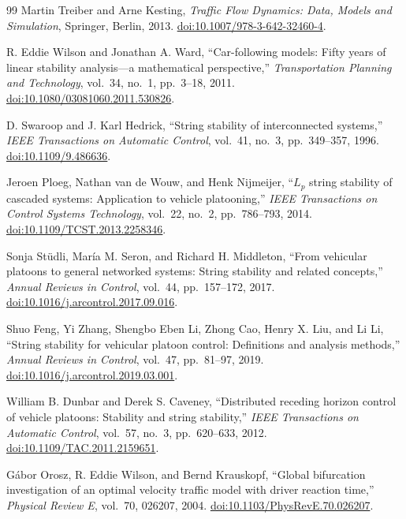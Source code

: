 \documentclass[11pt,a4paper,openany]{book}
\numberwithin{equation}{chapter}
\numberwithin{figure}{chapter}
\numberwithin{table}{chapter}
\begin{document}
\begin{thebibliography}{99}
Martin Treiber and Arne Kesting,
\emph{Traffic Flow Dynamics: Data, Models and Simulation},
Springer, Berlin, 2013.
\href{https://doi.org/10.1007/978-3-642-32460-4}{doi:10.1007/978-3-642-32460-4}.

R. Eddie Wilson and Jonathan A. Ward,
``Car-following models: Fifty years of linear stability analysis---a mathematical perspective,''
\emph{Transportation Planning and Technology}, vol.~34, no.~1, pp.~3--18, 2011.
\href{https://doi.org/10.1080/03081060.2011.530826}{doi:10.1080/03081060.2011.530826}.

D. Swaroop and J. Karl Hedrick,
``String stability of interconnected systems,''
\emph{IEEE Transactions on Automatic Control}, vol.~41, no.~3, pp.~349--357, 1996.
\href{https://doi.org/10.1109/9.486636}{doi:10.1109/9.486636}.

Jeroen Ploeg, Nathan van de Wouw, and Henk Nijmeijer,
``$L_p$ string stability of cascaded systems: Application to vehicle platooning,''
\emph{IEEE Transactions on Control Systems Technology}, vol.~22, no.~2, pp.~786--793, 2014.
\href{https://doi.org/10.1109/TCST.2013.2258346}{doi:10.1109/TCST.2013.2258346}.

Sonja St\"udli, María M. Seron, and Richard H. Middleton,
``From vehicular platoons to general networked systems: String stability and related concepts,''
\emph{Annual Reviews in Control}, vol.~44, pp.~157--172, 2017.
\href{https://doi.org/10.1016/j.arcontrol.2017.09.016}{doi:10.1016/j.arcontrol.2017.09.016}.

Shuo Feng, Yi Zhang, Shengbo Eben Li, Zhong Cao, Henry X. Liu, and Li Li,
``String stability for vehicular platoon control: Definitions and analysis methods,''
\emph{Annual Reviews in Control}, vol.~47, pp.~81--97, 2019.
\href{https://doi.org/10.1016/j.arcontrol.2019.03.001}{doi:10.1016/j.arcontrol.2019.03.001}.

William B. Dunbar and Derek S. Caveney,
``Distributed receding horizon control of vehicle platoons: Stability and string stability,''
\emph{IEEE Transactions on Automatic Control}, vol.~57, no.~3, pp.~620--633, 2012.
\href{https://doi.org/10.1109/TAC.2011.2159651}{doi:10.1109/TAC.2011.2159651}.

Gábor Orosz, R. Eddie Wilson, and Bernd Krauskopf,
``Global bifurcation investigation of an optimal velocity traffic model with driver reaction time,''
\emph{Physical Review E}, vol.~70, 026207, 2004.
\href{https://doi.org/10.1103/PhysRevE.70.026207}{doi:10.1103/PhysRevE.70.026207}.


\end{thebibliography}
\end{document}
